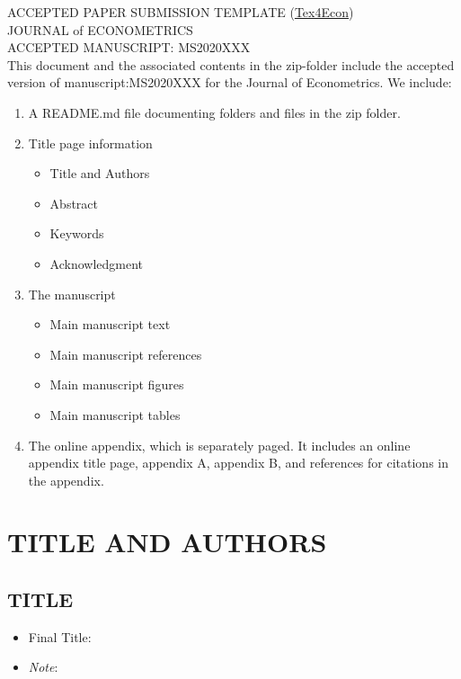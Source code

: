 \documentclass[12pt,english]{article}
\begin{document}
\thispagestyle{empty}
\begingroup
  \doublespacing
  \centering
  \LARGE ACCEPTED PAPER SUBMISSION TEMPLATE (\href{https://fanwangecon.github.io/Tex4Econ}{Tex4Econ})\\[0.25em]
  \LARGE JOURNAL of ECONOMETRICS\\[0.25em]
  \LARGE ACCEPTED MANUSCRIPT: MS2020XXX \\[1.0em]
\endgroup
This document and the associated contents in the zip-folder include the accepted version of manuscript:MS2020XXX for the Journal of Econometrics. We include:
\begin{enumerate}
    \item A README.md file documenting folders and files in the zip folder.
    \item Title page information
    \begin{itemize}
        \item Title and Authors
        \item Abstract
        \item Keywords
        \item Acknowledgment
    \end{itemize}
    \item The manuscript
    \begin{itemize}
        \item Main manuscript text
        \item Main manuscript references
        \item Main manuscript figures
        \item Main manuscript tables
    \end{itemize}    
    \item The online appendix, which is separately paged. It includes an online appendix title page, appendix A, appendix B, and references for citations in the appendix.
\end{enumerate}
\clearpage


\setcounter{page}{1}

\section*{TITLE AND AUTHORS}
\subsection*{TITLE}
\begin{itemize}[label={}, leftmargin=*]
    \item Final Title: \textbf{\PAPERTITLE}
    \item[] \emph{Note}: \blindtext
\end{itemize}
\end{document}
